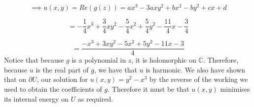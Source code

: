 \documentclass[12pt]{article}
\begin{document}
\[
\implies u(x,y) = Re(g(z)) =ax^3 - 3axy^2+bx^2-by^2+cx+d
\]

\[
=  -\frac{1}{4}x^3 + \frac{3}{4}xy^2 - \frac{5}{4}x^2 +\frac{5}{4}y^2 -\frac{11}{4}x - \frac{3}{4}
\]

\[
= \frac{-x^3+3xy^2-5x^2+5y^2-11x-3}{4}
\]
\[\]
\noindent Notice that because \(g\) is a polynomial in \(z\), it is holomorphic on \(\mathbb{C}\). Therefore, because \(u\) is the real part of \(g\), we have that \(u\) is harmonic. We also have shown that on \(\partial U\), our solution for \(u(x,y) = y^2 - x^3\) by the reverse of the working we used to obtain the coefficients of \(g\). Therefore it must be that \(u(x,y)\) minimises its internal energy on \(U\) as required. 
 



\hrulefill
\end{document}
